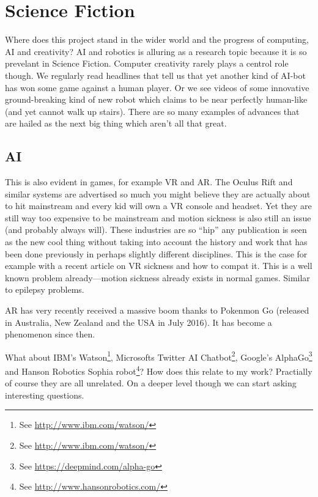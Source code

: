 \section{Science Fiction}

Where does this project stand in the wider world and the progress of computing, \ac{AI} and creativity? \ac{AI} and robotics is alluring as a research topic because it is so prevelant in Science Fiction. Computer creativity rarely plays a centrol role though. We regularly read headlines that tell us that yet another kind of \ac{AI}-bot has won some game against a human player. Or we see videos of some innovative ground-breaking kind of new robot which claims to be near perfectly human-like (and yet cannot walk up stairs). There are so many examples of advances that are hailed as the next big thing which aren't all that great. 

\subsection{AI}
This is also evident in games, for example \ac{VR} and \ac{AR}. The Oculus Rift and similar systems are advertised so much you might believe they are actually about to hit mainstream and every kid will own a \ac{VR} console and headset. Yet they are still way too expensive to be mainstream and motion sickness is also still an issue (and probably always will). These industries are so ``hip'' any publication is seen as the new cool thing without taking into account the history and work that has been done previously in perhaps slightly different disciplines. This is the case for example with a recent article on \ac{VR} sickness and how to compat it. This is a well known problem already---motion sickness already exists in normal games. Similar to epilepsy problems.


\ac{AR} has very recently received a massive boom thanks to Pokenmon Go (released in Australia, New Zealand and the USA in July 2016). It has become a phenomenon since then.

What about IBM's Watson\footnote{See \url{http://www.ibm.com/watson/}}, Microsofts Twitter \ac{AI} Chatbot\footnote{See \url{http://www.ibm.com/watson/}}, Google's AlphaGo\footnote{See \url{https://deepmind.com/alpha-go}} and Hanson Robotics Sophia robot\footnote{See \url{http://www.hansonrobotics.com/}}? How does this relate to my work? Practially of course they are all unrelated. On a deeper level though we can start asking interesting questions. 

